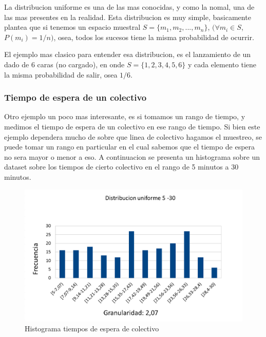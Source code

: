 	La distribucion uniforme es una de las mas conocidas, y como la nomal, una de las mas presentes en la realidad.
	Esta distribucion es muy simple, basicamente plantea que si tenemos un espacio muestral $S=\{m_1, m_2, ... ,m_n\}$, $(\forall m_i \in S$,  $P(m_i)=1/n)$, osea, todos los sucesos tiene la misma probabilidad de ocurrir. 
			
	El ejemplo mas clasico para entender esa distribucion, es el lanzamiento de un dado de 6 caras (no cargado), en onde $S = \{1, 2, 3, 4, 5, 6\}$ y cada elemento tiene la misma probabilidad de salir, osea $1/6$.
			
\subsubsection*{Tiempo de espera de un colectivo}

	Otro ejemplo un poco mas interesante, es si tomamos un rango de tiempo, y medimos el tiempo de espera de un colectivo en ese rango de tiempo. Si bien este ejemplo dependera mucho de sobre que linea de colectivo hagamos el muestreo, se puede tomar un rango en particular en el cual sabemos que el tiempo de espera no sera mayor o menor a eso. A continuacion se presenta un histograma sobre un dataset sobre los tiempos de cierto colectivo en el rango de 5 minutos a 30 minutos.

\newpage					
	\begin{figure}[H]
	  \begin{center}
	    \includegraphics[scale=.40]{imagenes/uniforme_ejemplo.png}
	    \caption{Histograma tiempos de espera de colectivo} 
	    \label{fig:normal_ejemplo1}
	  \end{center}
	\end{figure}